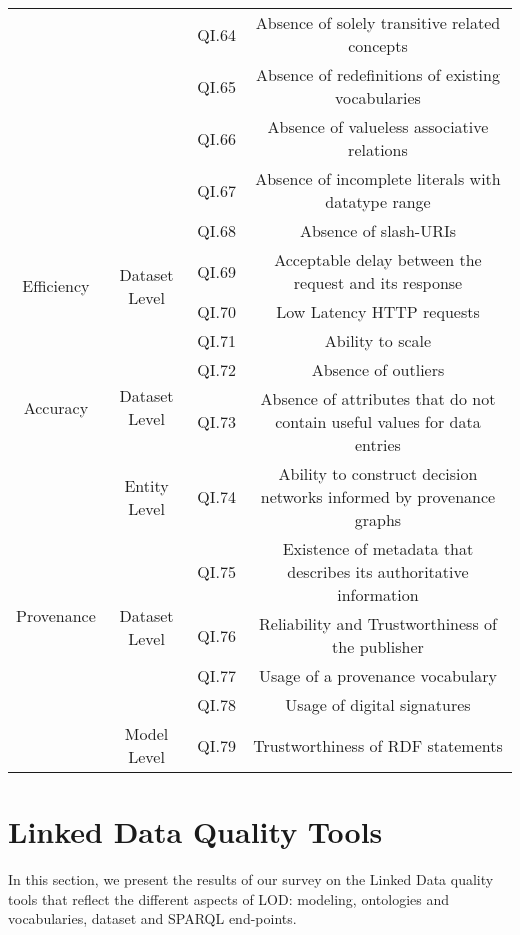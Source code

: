 \documentclass[onecolumn, crcready]{iosart2c}
\begin{document}
\begin{landscape}
\begin{center}
{\begin{longtable}[h]{|c|c|c|c|}
\cline{3-4} 
 &  & QI.64 & Absence of solely transitive related concepts \cite{Mader2012}\tabularnewline
\cline{3-4} 
 &  & QI.65 & Absence of redefinitions of existing vocabularies  \cite{Hogan2010}\tabularnewline
\cline{3-4} 
 &  & QI.66 & Absence of valueless associative relations  \cite{Mader2012}\tabularnewline
\cline{3-4} 
 &  & QI.67 & Absence of incomplete literals with datatype range \cite{Hogan2010}\tabularnewline
\hline 
\hline 
\multirow{4}{*}{Efficiency} & \multirow{4}{*}{Dataset Level} & QI.68 & Absence of slash-URIs \cite{Framework2012}\tabularnewline
\cline{3-4} 
 &  & QI.69 & Acceptable delay between the request and its response \cite{citeulike:2925559}\tabularnewline
\cline{3-4} 
 &  & QI.70 & Low Latency HTTP requests \cite{Framework2012}\tabularnewline
\cline{3-4} 
 &  & QI.71 & Ability to scale \cite{Framework2012}\tabularnewline
\hline 
\hline 
\multirow{2}{*}{Accuracy} & \multirow{2}{*}{Dataset Level} & QI.72 & Absence of outliers \cite{Framework2012}\tabularnewline
\cline{3-4} 
 &  & QI.73 & Absence of attributes that do not contain useful values for data entries \cite{Framework2012}\tabularnewline
\hline
\hline
\multirow{6}{*}{Provenance} & \multirow{1}{*}{Entity Level} & QI.74 & Ability to construct decision networks informed by provenance graphs \cite{Gamble2011}\tabularnewline
\cline{2-4} 
 & \multirow{4}{*}{Dataset Level} & QI.75 & Existence of metadata that describes its authoritative information  \cite{Flouris2012}\tabularnewline
\cline{3-4} 
 &  & QI.76 & Reliability and Trustworthiness of the publisher \cite{Flouris2012}\tabularnewline
\cline{3-4} 
 &  & QI.77 & Usage of a provenance vocabulary\tabularnewline
\cline{3-4} 
 &  & QI.78 & Usage of digital signatures \cite{Framework2012}\tabularnewline
\cline{2-4} 
 & \multirow{1}{*}{Model Level} & QI.79 & Trustworthiness of RDF statements \cite{Hartig09usingweb}\tabularnewline
\hline
\end{longtable}
}
\end{center}
\end{landscape}

\section{Linked Data Quality Tools}
In this section, we present the results of our survey on the Linked Data quality tools that reflect the different aspects of LOD: modeling, ontologies and vocabularies, dataset and SPARQL end-points.\\
\end{document}
